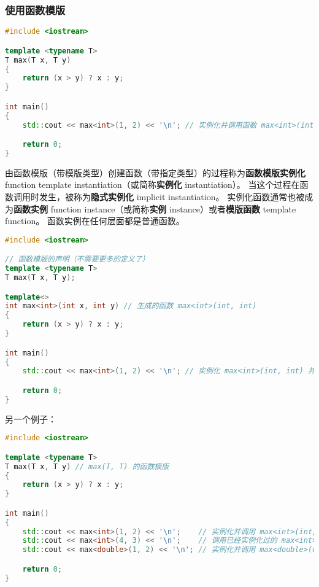 \documentclass[../../LearnCpp.tex]{subfiles}
\begin{document}

\subsubsection*{使用函数模版}

\begin{lstlisting}[language=C++]
#include <iostream>

template <typename T>
T max(T x, T y)
{
    return (x > y) ? x : y;
}

int main()
{
    std::cout << max<int>(1, 2) << '\n'; // 实例化并调用函数 max<int>(int, int)

    return 0;
}
\end{lstlisting}

由函数模版（带模版类型）创建函数（带指定类型）的过程称为\textbf{函数模版实例化} function template instantiation（或简称\textbf{实例化} instantiation）。
当这个过程在函数调用时发生，被称为\textbf{隐式实例化} implicit instantiation。
实例化函数通常也被成为\textbf{函数实例} function instance（或简称\textbf{实例} instance）或者\textbf{模版函数} template function。
函数实例在任何层面都是普通函数。

\begin{lstlisting}[language=C++]
#include <iostream>

// 函数模版的声明（不需要更多的定义了）
template <typename T>
T max(T x, T y);

template<>
int max<int>(int x, int y) // 生成的函数 max<int>(int, int)
{
    return (x > y) ? x : y;
}

int main()
{
    std::cout << max<int>(1, 2) << '\n'; // 实例化 max<int>(int, int) 并调用

    return 0;
}
\end{lstlisting}

另一个例子：

\begin{lstlisting}[language=C++]
#include <iostream>

template <typename T>
T max(T x, T y) // max(T, T) 的函数模版
{
    return (x > y) ? x : y;
}

int main()
{
    std::cout << max<int>(1, 2) << '\n';    // 实例化并调用 max<int>(int, int)
    std::cout << max<int>(4, 3) << '\n';    // 调用已经实例化过的 max<int>(int, int)
    std::cout << max<double>(1, 2) << '\n'; // 实例化并调用 max<double>(double, double)

    return 0;
}
\end{lstlisting}
\end{document}

